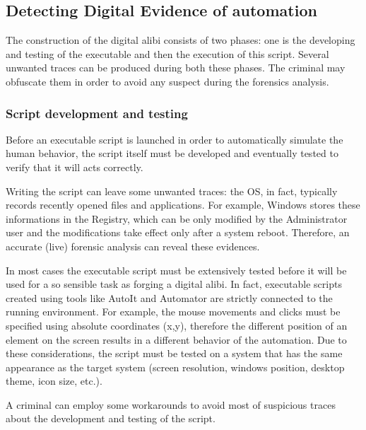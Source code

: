 \documentclass[runningheads,english]{llncs}
\begin{document}
\subsection{Detecting Digital Evidence of automation}

The construction of the digital alibi consists of two phases: one is the developing and testing of the executable and then the execution of this script.
Several unwanted traces can be produced during both these phases. The criminal may obfuscate them in order to avoid any suspect during the forensics analysis.

\subsubsection{Script development and testing }
\label{subsub:devetest}

Before an executable script is launched in order to automatically simulate the human behavior, the script itself must be developed and eventually tested to verify that it will acts correctly.

Writing the script can leave some unwanted traces: the OS, in fact, typically records recently opened files and applications. For example, Windows stores these informations in the Registry, which can be only modified by the Administrator user and the modifications take effect only after a system reboot. Therefore, an accurate (live) forensic analysis can reveal these evidences.

In most cases the executable script must be extensively tested before it will be used for a so sensible task as forging a digital alibi. In fact, executable scripts created using tools like AutoIt and Automator are strictly connected to the running environment. For example, the mouse movements and clicks must be specified using absolute coordinates (x,y), therefore the different position of an element on the screen results in a different behavior of the automation. Due to these considerations, the script must be tested on a system that has the same appearance as the target system (screen resolution, windows position, desktop theme, icon size, etc.).

A criminal can employ some workarounds to avoid most of suspicious traces about the development and testing of the script. 
\end{document}
